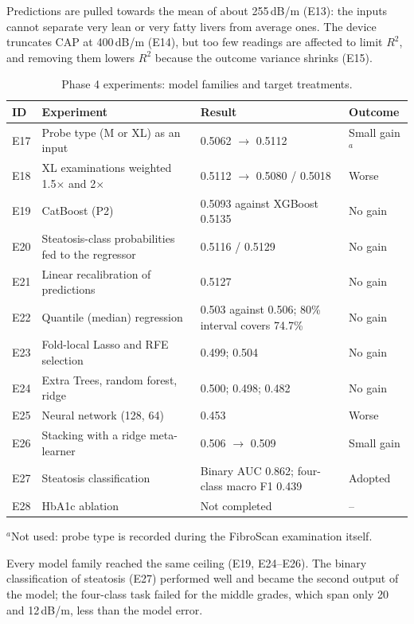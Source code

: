 Predictions are pulled towards the mean of about 255\,dB/m (E13): the inputs cannot separate very lean or very fatty livers from average ones. The device truncates CAP at 400\,dB/m (E14), but too few readings are affected to limit $R^2$, and removing them lowers $R^2$ because the outcome variance shrinks (E15).

\begin{table}[t]
\centering
\small
\caption{Phase 4 experiments: model families and target treatments.}
\label{tab:phase4b}
\begin{tabularx}{\textwidth}{@{}l Y Y l@{}}
\toprule
ID & Experiment & Result & Outcome \\
\midrule
E17 & Probe type (M or XL) as an input & 0.5062 $\rightarrow$ 0.5112 & Small gain$^{a}$ \\
E18 & XL examinations weighted 1.5$\times$ and 2$\times$ & 0.5112 $\rightarrow$ 0.5080 / 0.5018 & Worse \\
E19 & CatBoost (P2) & 0.5093 against XGBoost 0.5135 & No gain \\
E20 & Steatosis-class probabilities fed to the regressor & 0.5116 / 0.5129 & No gain \\
E21 & Linear recalibration of predictions & 0.5127 & No gain \\
E22 & Quantile (median) regression & 0.503 against 0.506; 80\% interval covers 74.7\% & No gain \\
E23 & Fold-local Lasso and RFE selection & 0.499; 0.504 & No gain \\
E24 & Extra Trees, random forest, ridge & 0.500; 0.498; 0.482 & No gain \\
E25 & Neural network (128, 64) & 0.453 & Worse \\
E26 & Stacking with a ridge meta-learner & 0.506 $\rightarrow$ 0.509 & Small gain \\
E27 & Steatosis classification & Binary AUC 0.862; four-class macro F1 0.439 & Adopted \\
E28 & HbA1c ablation & Not completed & -- \\
\bottomrule
\end{tabularx}
\par\smallskip
{\footnotesize $^{a}$Not used: probe type is recorded during the FibroScan examination itself.}
\end{table}

Every model family reached the same ceiling (E19, E24--E26). The binary classification of steatosis (E27) performed well and became the second output of the model; the four-class task failed for the middle grades, which span only 20 and 12\,dB/m, less than the model error.

